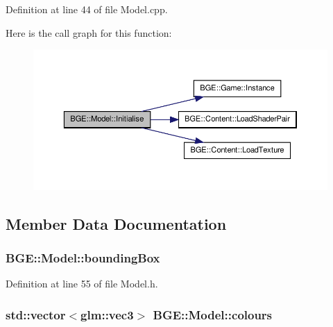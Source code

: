 Definition at line 44 of file Model.\-cpp.



Here is the call graph for this function\-:
\nopagebreak
\begin{figure}[H]
\begin{center}
\leavevmode
\includegraphics[width=350pt]{class_b_g_e_1_1_model_abaa883a7def8ea1957a211bbf7b4f399_cgraph}
\end{center}
\end{figure}




\subsection{Member Data Documentation}
\hypertarget{class_b_g_e_1_1_model_a44723a79125d28e2cec5d70d4a4363d1}{
\subsubsection[{bounding\-Box}]{ B\-G\-E\-::\-Model\-::bounding\-Box}}\label{class_b_g_e_1_1_model_a44723a79125d28e2cec5d70d4a4363d1}


Definition at line 55 of file Model.\-h.

\hypertarget{class_b_g_e_1_1_model_a823f2c370081fbc2438da2de700271fd}{
\subsubsection[{colours}]{\setlength{\rightskip}{0pt plus 5cm}std\-::vector$<$glm\-::vec3$>$ B\-G\-E\-::\-Model\-::colours}}\label{class_b_g_e_1_1_model_a823f2c370081fbc2438da2de700271fd}



